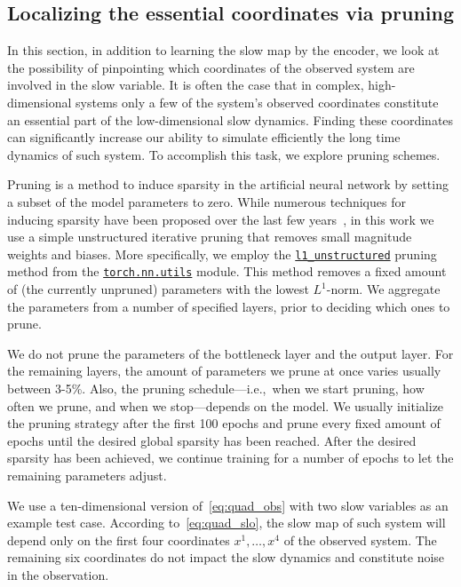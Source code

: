 \documentclass{article}
\begin{document}
\subsection{Localizing the essential coordinates via pruning}
\label{sec:essential_coords}
In this section, in addition to learning the slow map by the encoder, we look at the possibility of pinpointing which coordinates of the observed system are involved in the slow variable. It is often the case that in complex, high-dimensional systems only a few of the system's observed coordinates constitute an essential part of the low-dimensional slow dynamics. Finding these coordinates can significantly increase our ability to simulate efficiently the long time dynamics of such system. To accomplish this task, we explore pruning schemes.

Pruning is a method to induce sparsity in the artificial neural network by setting a subset of the model parameters to zero. While numerous techniques for inducing sparsity have been proposed over the last few years~\cite{gale_state_2019}, in this work we use a simple unstructured iterative pruning that removes small magnitude weights and biases. More specifically, we employ the \href{https://pytorch.org/docs/stable/generated/torch.nn.utils.prune.l1_unstructured.html}{\texttt{l1\_unstructured}} pruning method from the \href{https://pytorch.org/docs/stable/nn.html#utilities}{\texttt{torch.nn.utils}} module. This method removes a fixed amount of (the currently unpruned) parameters with the lowest $L^1$-norm. We aggregate the parameters from a number of specified layers, prior to deciding which ones to prune.

We do not prune the parameters of the bottleneck layer and the output layer. For the remaining layers, the amount of parameters we prune at once varies usually between 3-5\%. Also, the pruning schedule---i.e.,~when we start pruning, how often we prune, and when we stop---depends on the model. We usually initialize the pruning strategy after the first 100 epochs and prune every fixed amount of epochs until the desired global sparsity has been reached. After the desired sparsity has been achieved, we continue training for a number of epochs to let the remaining parameters adjust.

We use a ten-dimensional version of~\eqref{eq:quad_obs} with two slow variables as an example test case. According to~\eqref{eq:quad_slo}, the slow map of such system will depend only on the first four coordinates $x^1,\dots,x^4$ of the observed system. The remaining six coordinates do not impact the slow dynamics and constitute noise in the observation.
\end{document}
